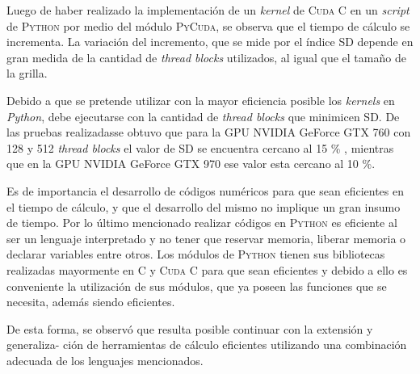 
\newpage
Luego de haber realizado la implementación de un \textit{kernel} de \textsc{Cuda C} en un \textit{script} de \textsc{Python} por medio del módulo \textsc{PyCuda}, se observa que el tiempo de cálculo se incrementa. La variación del incremento, que se mide por el índice SD depende en gran medida de la cantidad de \textit{thread blocks} utilizados, al igual que el tamaño de la grilla.

Debido a que se pretende utilizar con la mayor eficiencia posible los \textit{kernels} en \textit{Python}, debe ejecutarse con la cantidad de \textit{thread blocks} que minimicen SD. De las pruebas realizadasse obtuvo que para la GPU NVIDIA GeForce GTX 760 con 128 y 512  \textit{thread blocks} el valor de SD se encuentra cercano al 15 \% , mientras que en la GPU NVIDIA GeForce GTX 970 ese valor esta cercano al 10 \%.

Es de importancia el desarrollo de códigos numéricos para que sean eficientes en el tiempo de cálculo, y que el desarrollo del mismo no implique un gran insumo de tiempo. Por lo último mencionado realizar códigos en \textsc{Python} es eficiente al ser un lenguaje interpretado y no tener que reservar memoria, liberar memoria o declarar variables entre otros. Los módulos de \textsc{Python} tienen sus bibliotecas realizadas mayormente en \textsc{C} y \textsc{Cuda C} para que sean eficientes y debido a ello es conveniente la utilización de sus módulos, que ya poseen las funciones que se necesita, además siendo eficientes. 

De esta forma, se observó que resulta posible continuar con la extensión y generaliza- ción de herramientas de cálculo eficientes utilizando una combinación adecuada de los lenguajes mencionados.





